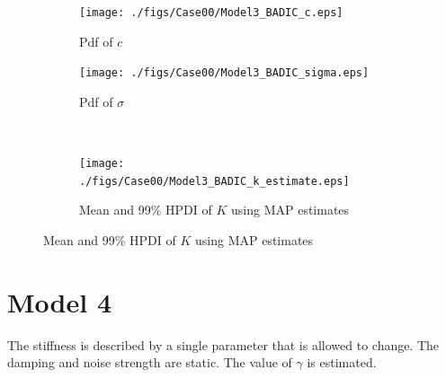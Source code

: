\documentclass[]{elsarticle}
\begin{document}
\begin{figure}[!htb]
\centering
\begin{subfigure}{.49\textwidth}
\texttt{[image: ./figs/Case00/Model3\_BADIC\_c.eps]}
\caption{Pdf of $c$}
\end{subfigure}
\begin{subfigure}{.49\textwidth}
\centering
\texttt{[image: ./figs/Case00/Model3\_BADIC\_sigma.eps]}
\caption{Pdf of $\sigma$}
\label{fig:s1c}
\end{subfigure}\\
\begin{subfigure}{.99\textwidth}
\centering
\texttt{[image: ./figs/Case00/Model3\_BADIC\_k\_estimate.eps]}
\caption{Mean and 99\% HPDI of $K$ using MAP estimates}
\label{fig:s1d}
\end{subfigure}
\end{figure}




\section*{Model 4}

The stiffness is described by a single parameter that is allowed to change. The damping and noise strength are static. The value of $\gamma$ is estimated. 
\end{document}
